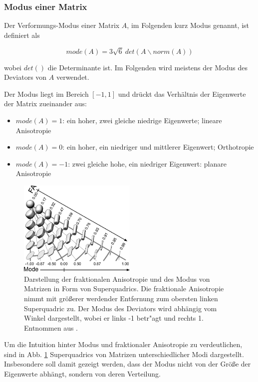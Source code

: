 \documentclass[a4paper,fontsize=12pt,toc=bib,halfparskip]{scrartcl}
\begin{document}
\subsubsection{Modus einer Matrix}
Der Verformungs-Modus \cite{criscione2000invariant} einer Matrix $A$, im Folgenden kurz Modus genannt, ist definiert als

\begin{equation}
	mode(A) = 3\sqrt{6}~det(A\backslash norm(A))
\end{equation}

wobei $det()$ die Determinante ist. Im Folgenden wird meistens der Modus des Deviators von $A$ verwendet.

Der Modus liegt im Bereich $[-1,1]$ und dr\"uckt das Verh\"altnis der Eigenwerte der Matrix zueinander aus:

\begin{itemize}
	\item $mode(A) = 1$: ein hoher, zwei gleiche niedrige Eigenwerte; lineare Anisotropie
	\item $mode(A) = 0$: ein hoher, ein niedriger und mittlerer Eigenwert; Orthotropie
	\item $mode(A) = -1$: zwei gleiche hohe, ein niedriger Eigenwert: planare Anisotropie
\end{itemize} 

\begin{figure}
	\centering
	\includegraphics[width=0.5\textwidth]{pictures/-001.png}
	\caption{Darstellung der fraktionalen Anisotropie und des Modus von Matrizen in Form von Superquadrics\cite{kindlmann2004superquadric}. Die fraktionale Anisotropie nimmt mit gr\"o{\ss}erer werdender Entfernung zum obersten linken Superquadric zu. Der Modus des Deviators wird abh\"angig vom Winkel dargestellt, wobei er links -1 betr"agt und rechts 1. Entnommen aus \cite[S.~140]{ennis2006orthogonal}.}
	\label{Modus}
\end{figure}
Um die Intuition hinter Modus und fraktionaler Anisotropie zu verdeutlichen, sind in Abb. \ref{Modus} Superquadrics von Matrizen unterschiedlicher Modi dargestellt. Insbesondere soll damit gezeigt werden, dass der Modus nicht von der Gr\"o{\ss}e der Eigenwerte abh\"angt, sondern von deren Verteilung.
\end{document}
